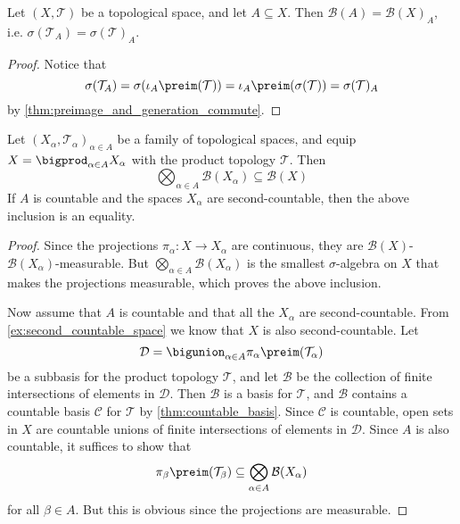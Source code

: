 \documentclass[article, a4paper, 11pt, oneside]{memoir}
\numberwithin{equation}{chapter}
\newcommand{\calT}{\mathcal{T}}
\newcommand{\calB}{\mathcal{B}}
\newcommand{\calC}{\mathcal{C}}
\newcommand{\calD}{\mathcal{D}}
\newcommand{\borel}{\mathcal{B}}
\begin{document}
\begin{proposition}
    Let $(X, \calT)$ be a topological space, and let $A \subseteq X$. Then $\borel(A) = \borel(X)_A$, i.e. $\sigma(\calT_A) = \sigma(\calT)_A$.
\end{proposition}

\begin{proof}
    Notice that
    \begin{equation*}
        \sigma(\calT_A)
            = \sigma(\iota_A\preim(\calT))
            = \iota_A\preim(\sigma(\calT))
            = \sigma(\calT)_A
    \end{equation*}
    by \cref{thm:preimage_and_generation_commute}.
\end{proof}



\begin{theorem}
    Let $(X_\alpha, \calT_\alpha)_{\alpha \in A}$ be a family of topological spaces, and equip $X = \bigprod_{\alpha \in A} X_\alpha$ with the product topology $\calT$. Then
    \begin{equation*}
        \bigotimes_{\alpha \in A} \borel(X_\alpha)
            \subseteq \borel(X)
    \end{equation*}
    If $A$ is countable and the spaces $X_\alpha$ are second-countable, then the above inclusion is an equality.
\end{theorem}

\begin{proof}
    Since the projections $\pi_\alpha \colon X \to X_\alpha$ are continuous, they are $\borel(X)$-$\borel(X_\alpha)$-measurable. But $\bigotimes_{\alpha \in A} \borel(X_\alpha)$ is the smallest $\sigma$-algebra on $X$ that makes the projections measurable, which proves the above inclusion.
    
    Now assume that $A$ is countable and that all the $X_\alpha$ are second-countable. From \cref{ex:second_countable_space} we know that $X$ is also second-countable. Let
    \begin{equation*}
        \calD = \bigunion_{\alpha \in A} \pi_\alpha\preim(\calT_\alpha)
    \end{equation*}
    be a subbasis for the product topology $\calT$, and let $\calB$ be the collection of finite intersections of elements in $\calD$. Then $\calB$ is a basis for $\calT$, and $\calB$ contains a countable basis $\calC$ for $\calT$ by \cref{thm:countable_basis}. Since $\calC$ is countable, open sets in $X$ are countable unions of finite intersections of elements in $\calD$. Since $A$ is also countable, it suffices to show that
    \begin{equation*}
        \pi_\beta\preim(\calT_\beta)
            \subseteq \bigotimes_{\alpha \in A} \borel(X_\alpha)
    \end{equation*}
    for all $\beta \in A$. But this is obvious since the projections are measurable.
\end{proof}


\nocite{*}

\printbibliography
\end{document}
